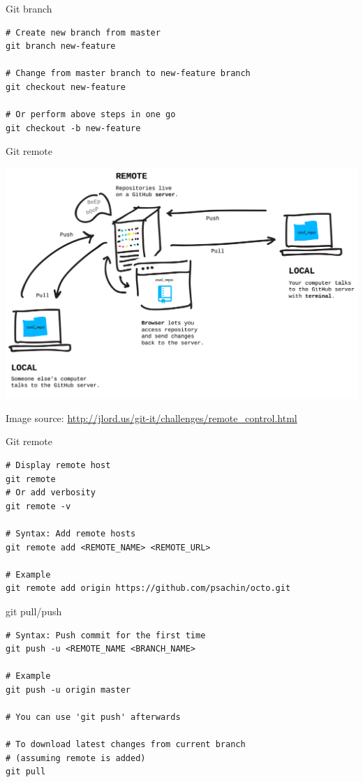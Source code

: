 \documentclass[10pt]{beamer}
\begin{document}
\begin{frame}[fragile,label={sec:org2fe5ce7}]{Git branch}
 \begin{verbatim}
# Create new branch from master
git branch new-feature

# Change from master branch to new-feature branch
git checkout new-feature

# Or perform above steps in one go
git checkout -b new-feature
\end{verbatim}
\end{frame}

\begin{frame}[label={sec:org5798f2d}]{Git remote}
\begin{center}
\includegraphics[width=.9\linewidth]{./remotes.png}
\end{center}

Image source: \url{http://jlord.us/git-it/challenges/remote\_control.html}
\end{frame}

\begin{frame}[fragile,label={sec:org6a01c72}]{Git remote}
 \begin{verbatim}
# Display remote host
git remote
# Or add verbosity
git remote -v

# Syntax: Add remote hosts
git remote add <REMOTE_NAME> <REMOTE_URL>

# Example
git remote add origin https://github.com/psachin/octo.git
\end{verbatim}
\end{frame}

\begin{frame}[fragile,label={sec:org8236c74}]{git pull/push}
 \begin{verbatim}
# Syntax: Push commit for the first time
git push -u <REMOTE_NAME <BRANCH_NAME>

# Example
git push -u origin master

# You can use 'git push' afterwards

# To download latest changes from current branch
# (assuming remote is added)
git pull
\end{verbatim}
\end{frame}
\end{document}
